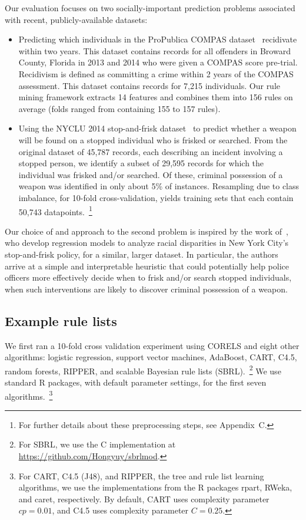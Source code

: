 Our evaluation focuses on two socially-important prediction problems associated
with recent, publicly-available datasets:
\begin{itemize}
\item Predicting which individuals in the ProPublica COMPAS
dataset~\citep{LarsonMaKiAn16} recidivate within two years.
This dataset contains records for all offenders in Broward County, Florida
in 2013 and 2014 who were given a COMPAS score pre-trial.
Recidivism is defined as committing a crime within 2 years of the COMPAS
assessment.
This dataset contains records for 7,215 individuals.
%
Our rule mining framework extracts 14 features and combines them into
156 rules on average (folds ranged from containing 155 to 157 rules).
%
\item Using the NYCLU 2014 stop-and-frisk dataset~\citep{nyclu:2014} to predict
whether a weapon will be found on a stopped individual who is frisked or searched.
%
From the original dataset of 45,787 records, each describing an incident involving
a stopped person, we identify a subset of 29,595 records for which the individual
was frisked and/or searched.
%
Of these, criminal possession of a weapon was identified in only about 5\% of instances.
%
Resampling due to class imbalance, for 10-fold cross-validation, yields training sets
that each contain 50,743 datapoints.~\footnote{For further details about these
preprocessing steps, see Appendix~C.}
\end{itemize}
%
Our choice of and approach to the second problem is inspired by the work
of~\citet{Goel16}, who develop regression models to analyze racial disparities
in New York City's stop-and-frisk policy, for a similar, larger dataset.
%
In particular, the authors arrive at a simple and interpretable heuristic that
could potentially help police officers more effectively decide when to
frisk and/or search stopped individuals, \ie when such
interventions are likely to discover criminal possession of a weapon.

\subsection{Example rule lists}

We first ran a 10-fold cross validation experiment using CORELS
and eight other algorithms:
logistic regression, support vector machines, AdaBoost, CART, C4.5,
random forests, RIPPER, and scalable Bayesian rule lists (SBRL).~\footnote{For
SBRL, we use the C implementation at \url{https://github.com/Hongyuy/sbrlmod}.}
%
We use standard R packages, with default parameter settings,
for the first seven algorithms.~\footnote{For CART, C4.5 (J48), and RIPPER,
\ie the tree and rule list learning algorithms, we use the implementations
from the R packages rpart, RWeka, and caret, respectively.
%
By default, CART uses complexity parameter ${cp = 0.01}$,
and C4.5 uses complexity parameter ${C = 0.25}$.
}

